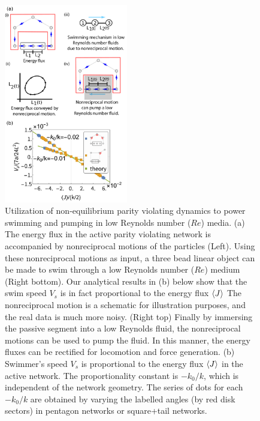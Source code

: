 \documentclass[
 preprint,
 preprintnumbers,
 amsmath,amssymb,
 aps,
 pre,
 longbibliography,
 superscriptaddress,
 10pt, twocolumn
]{revtex4-1}
\begin{document}
\begin{figure}[h!]
	\centering
	\includegraphics[width=0.48\textwidth]{swimmer_1.pdf}
    \caption{Utilization of non-equilibrium parity violating dynamics to power swimming and pumping in low Reynolds number ($Re$) media.
    (a) The energy flux in the active parity violating network is accompanied by nonreciprocal motions of the particles (Left). Using these nonreciprocal motions as input, a three bead linear object can be made to swim through a low Reynolds number ($Re$) medium (Right bottom). Our analytical results in (b) below show that the swim speed $V_s$ is in fact proportional to the energy flux $\expval{J}$ The nonreciprocal motion is a schematic for illustration purposes, and the real data is much more noisy. (Right top) Finally by immersing the passive segment into a low Reynolds fluid, the nonreciprocal motions can be used to pump the fluid. In this manner, the energy fluxes can be rectified for locomotion and force generation. 
    (b) Swimmer's speed $V_s$ is proportional to the energy flux $\expval{J}$ in the active network. The proportionality constant is $-k_0/k$, which is independent of the network geometry. The series of dots for each $-k_0/k$ are obtained by varying the labelled angles (by red disk sectors) in pentagon networks or square+tail networks.
    }
    \label{fig:swimmer}
\end{figure}
\end{document}
